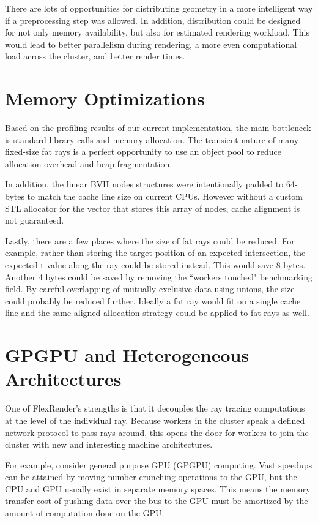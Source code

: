 \documentclass[12pt]{ucthesis}
\begin{document}
There are lots of opportunities for distributing geometry in a more intelligent
way if a preprocessing step was allowed. In addition, distribution could be
designed for not only memory availability, but also for estimated rendering
workload. This would lead to better parallelism during rendering, a more
even computational load across the cluster, and better render times.

\section{Memory Optimizations}
\label{memory}

Based on the profiling results of our current implementation, the main
bottleneck is standard library calls and memory allocation. The transient
nature of many fixed-size fat rays is a perfect opportunity to use an object
pool to reduce allocation overhead and heap fragmentation.

In addition, the linear BVH nodes structures were intentionally padded to
64-bytes to match the cache line size on current CPUs. However without a custom
STL allocator for the vector that stores this array of nodes, cache alignment
is not guaranteed.

Lastly, there are a few places where the size of fat rays could be reduced.
For example, rather than storing the target position of an expected
intersection, the expected t value along the ray could be stored instead. This
would save 8 bytes. Another 4 bytes could be saved by removing the ``workers
touched" benchmarking field. By careful overlapping of mutually exclusive data
using unions, the size could probably be reduced further. Ideally a fat ray
would fit on a single cache line and the same aligned allocation strategy could
be applied to fat rays as well.

\section{GPGPU and Heterogeneous Architectures}
\label{hetergenous}

One of FlexRender's strengths is that it decouples the ray tracing computations
at the level of the individual ray. Because workers in the cluster speak a
defined network protocol to pass rays around, this opens the door for workers to
join the cluster with new and interesting machine architectures.

For example, consider general purpose GPU (GPGPU) computing. Vast speedups can
be attained by moving number-crunching operations to the GPU, but the CPU and
GPU usually exist in separate memory spaces. This means the memory transfer cost
of pushing data over the bus to the GPU must be amortized by the amount of
computation done on the GPU.
\end{document}
